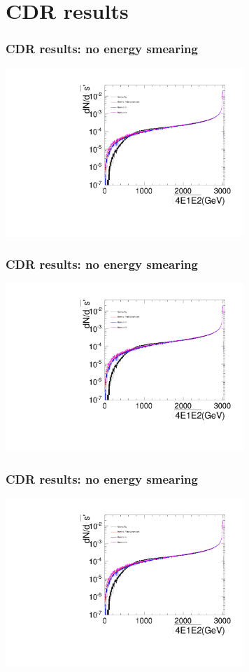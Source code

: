 \documentclass{beamer}
\begin{document}
\section{CDR results}
\begin{frame}
\frametitle{CDR results: no energy smearing}
\centering
\includegraphics[width=9cm,page=1]{Spectra_BHWide_noEsmearing}
\end{frame}
\begin{frame}
\frametitle{CDR results: no energy smearing}
\centering
\includegraphics[width=9cm,page=2]{Spectra_BHWide_noEsmearing}
\end{frame}
\begin{frame}
\frametitle{CDR results: no energy smearing}
\centering
\includegraphics[width=9cm,page=4]{Spectra_BHWide_noEsmearing}
\end{frame}
\end{document}

